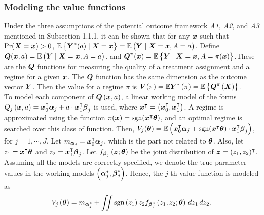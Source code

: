 \subsubsection{Modeling the value functions}
 Under the three assumptions of the potential outcome framework \textit{A1, A2}, and \textit{A3} mentioned in Subsection 1.1.1, it can be shown that for any $\boldsymbol{x}$ such that $\text{Pr}(\boldsymbol{X}=\boldsymbol{x})>0$, $\mathbb{E}\left\{ \boldsymbol{Y}^{*}(a)\mid\boldsymbol{X}=\boldsymbol{x}\right\} =\mathbb{E}\left(\boldsymbol{Y}\mid\boldsymbol{X}=\boldsymbol{x},A=a\right)$. Define $\boldsymbol{Q}(\boldsymbol{x},a)=\mathbb{E}\left(\boldsymbol{Y}\mid\boldsymbol{X}=\boldsymbol{x},A=a\right)$. and $\boldsymbol{Q}^{\pi}(\boldsymbol{x})=\mathbb{E}\left\{\boldsymbol{Y}\mid\boldsymbol{X}=\boldsymbol{x},A=\pi(\boldsymbol{x})\right\}$.These are the $\boldsymbol{Q}$ functions for measuring the quality of a treatment assignment and a regime for a given $\boldsymbol{x}$. The $\boldsymbol{Q}$ function has the same dimension as the outcome vector $\boldsymbol{Y}$. Then the value for a regime $\pi$ is $\boldsymbol{V}(\pi) = \mathbb{E} {\boldsymbol{Y}^{*}\left(\pi\right)} = \mathbb{E}\left\{ \boldsymbol{Q}^{\pi}\left(\boldsymbol{X}\right)\right\}$. \\

To model each component of $\boldsymbol{Q}\left(\boldsymbol{x}, a\right)$, a linear working model of the forms $Q_{j}\left(\boldsymbol{x},a\right)=\boldsymbol{x}_{0}^{\intercal}\boldsymbol{\alpha}_{j}+a\cdot\boldsymbol{x}_{1}^{\intercal}\boldsymbol{\beta}_{j}$ is used, where $\boldsymbol{x}^{\intercal}=\left(\boldsymbol{x}_{0}^{\intercal},\boldsymbol{x}_{1}^{\intercal}\right)$. A regime is approximated using the function $\pi(\boldsymbol{x}) = \text{sgn}(\boldsymbol{x}^{\intercal}\boldsymbol{\theta})$, and an optimal regime is searched over this class of function. Then, $V_j(\boldsymbol{\theta}) = \mathbb{E}\left(\boldsymbol{x}_{0}^{\intercal}\boldsymbol{\alpha}_{j}+\text{sgn}(\boldsymbol{x}^{\intercal}\boldsymbol{\theta})\cdot\boldsymbol{x}_{1}^{\intercal}\boldsymbol{\beta}_{j}\right)$, for $j = 1, \cdots, J$. Let $m_{\boldsymbol{\alpha}_j} = \boldsymbol{x}^{\intercal}_0 \boldsymbol{\alpha}_j$, which is the part not related to $\boldsymbol{\theta}$. Also, let $z_1 = \boldsymbol{x}^{\intercal}\boldsymbol{\theta}$ and $z_2 = \boldsymbol{x}_{1}^{\intercal}\boldsymbol{\beta}_{j}$. Let $f_{\boldsymbol{\beta}_j}\left(\boldsymbol{z}; \boldsymbol{\theta}\right)$ be the joint distribution of $\boldsymbol{z} = (z_1, z_2)^{\intercal}$. Assuming all the models are correctly specified, we denote the true parameter values in the working models $\left( \boldsymbol{\alpha}_{j}^{*}, \boldsymbol{\beta}_{j}^{*} \right)$. Hence, the $j$-th value function is modeled as $$V_j\left(\boldsymbol{\theta}\right) = m_{\boldsymbol{\alpha}^*_j}+ \iint \text{sgn}\left(z_1\right)z_2 f_{\boldsymbol{\beta}^*_j}\left(z_1, z_2; \boldsymbol{\theta}\right) \,dz_1 \,dz_2.$$ 

